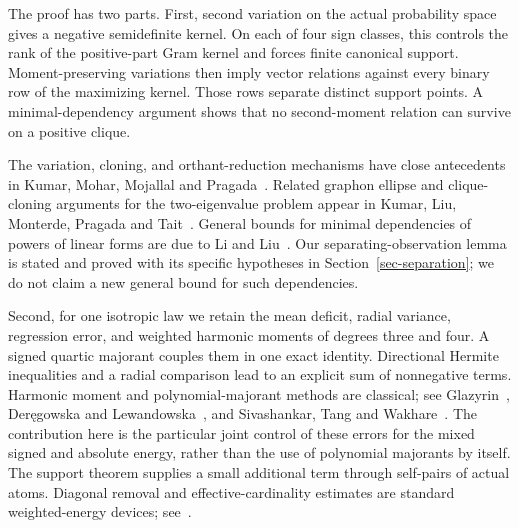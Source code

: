 The proof has two parts. First, second variation on the actual probability
space gives a negative semidefinite kernel. On each of four sign classes,
this controls the rank of the positive-part Gram kernel and forces finite
canonical support. Moment-preserving variations then imply vector
relations against every binary row of the maximizing kernel. Those rows
separate distinct support points. A minimal-dependency argument shows
that no second-moment relation can survive on a positive clique.

The variation, cloning, and orthant-reduction mechanisms have close
antecedents in Kumar, Mohar, Mojallal and Pragada~\cite{KMMP}. Related graphon
ellipse and clique-cloning arguments for the two-eigenvalue problem
appear in Kumar, Liu, Monterde, Pragada and Tait~\cite{KLMPT}. General
bounds for minimal dependencies of powers of linear forms are due to
Li and Liu~\cite{LiLiu}. Our separating-observation lemma is stated and
proved with its specific hypotheses in Section~\ref{sec-separation};
we do not claim a new general bound for such dependencies.

Second, for one isotropic law we retain the mean deficit, radial variance,
regression error, and weighted harmonic moments of degrees three and four.
A signed quartic majorant couples them in one exact identity. Directional
Hermite inequalities and a radial comparison lead to an explicit sum of
nonnegative terms. Harmonic moment and polynomial-majorant methods are
classical; see Glazyrin~\cite{Glazyrin}, Der\k{e}gowska and
Lewandowska~\cite{DL,DL-SW}, and Sivashankar, Tang and Wakhare~\cite{STW}.
The contribution here is the particular joint control of these errors
for the mixed signed and absolute energy, rather than the use of
polynomial majorants by itself. The support theorem supplies a small
additional term through self-pairs of actual atoms. Diagonal removal and
effective-cardinality estimates are standard weighted-energy devices;
see~\cite{Weighted}.
